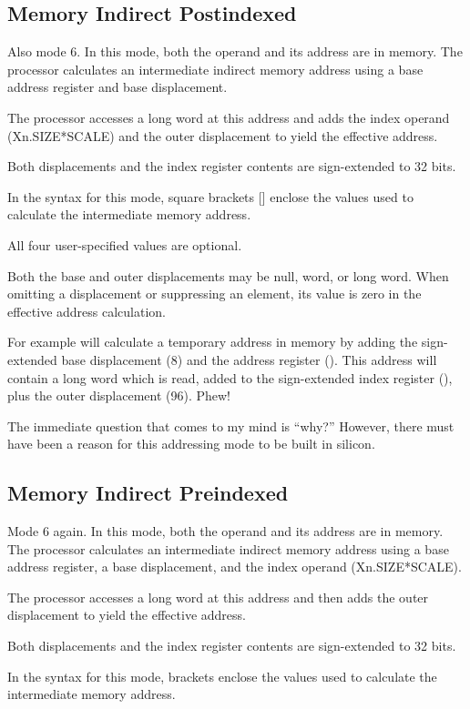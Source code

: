 \subsection{Memory Indirect Postindexed}\label{sub-MIPostI}
Also mode 6. In this mode, both the operand and its address are in memory. The processor calculates an intermediate indirect memory address using a base address register and base
displacement. 

The processor accesses a long word at this address and adds the index operand (Xn.SIZE*SCALE) and the outer displacement to yield the effective address. 

Both displacements and the index register contents are sign-extended to 32 bits.

In the syntax for this mode, square brackets [] enclose the values used to calculate the intermediate memory address.

All four user-specified values are optional. 

Both the base and outer displacements may be null, word, or long word. When omitting a displacement or suppressing an element, its value is zero in the effective address calculation.

For example  will calculate a temporary address in memory by adding the sign-extended base displacement (8) and the address register (). This address will contain a long word which is read, added to the sign-extended index register (), plus the outer displacement (96). Phew!

The immediate question that comes to my mind is ``why?'' However, there must have been a reason for this addressing mode to be built in silicon.

\subsection{Memory Indirect Preindexed}\label{sub-MIPreI}
Mode 6 again. In this mode, both the operand and its address are in memory. The processor calculates an intermediate indirect memory address using a base address register, a base displacement, and the index operand (Xn.SIZE*SCALE). 

The processor accesses a long word at this address and then adds the outer displacement to yield the effective address. 

Both displacements and the index register contents are sign-extended to 32 bits.

In the syntax for this mode, brackets enclose the values used to calculate the intermediate memory address. 

